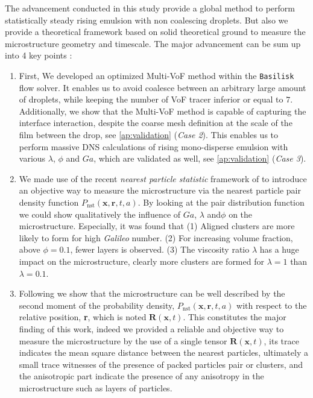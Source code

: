 The advancement conducted in this study provide a global method to perform statistically steady rising emulsion with non coalescing droplets.
But also we provide a theoretical framework based on solid theoretical ground to measure the microstructure geometry and timescale.
The major advancement can be sum up into 4 key points :
\begin{enumerate}
    \item First, We developed an optimized Multi-VoF method within the \texttt{Basilisk} flow solver. 
    It enables us to avoid coalesce between an arbitrary large amount of droplets, while keeping the number of VoF tracer inferior or equal to $7$. 
    Additionally, we show that the Multi-VoF method is capable of capturing the interface interaction, despite the coarse mesh definition at the scale of the film between the drop, see \ref{ap:validation} (\textit{Case 2}). 
    This enables us to perform massive DNS calculations of rising mono-disperse emulsion with various $\lambda$, $\phi$ and $Ga$, which are validated as well, see \ref{ap:validation} (\textit{Case 3}).  
    \item We made use of the recent \textit{nearest particle statistic} framework of \citet{zhang2023evolution} to introduce an objective way to measure the microstructure via the nearest particle pair density function $P_\text{nst}(\textbf{x},\textbf{r},t,a)$. 
    By looking at the pair distribution function we could show qualitatively the influence of $Ga$, $\lambda$ and$\phi$ on the microstructure.
    Especially, it was found that (1) Aligned clusters are more likely to form for high \textit{Galileo} number. (2) For increasing volume fraction, above $\phi = 0.1$, fewer layers is observed. (3) The viscosity ratio $\lambda$ has a huge impact on the microstructure, clearly more  clusters are formed for $\lambda = 1$ than $\lambda = 0.1$. 
    \item Following \citet{zhang2023evolution} we show that the microstructure can be well described by the second moment of the probability density, $P_\text{nst}(\textbf{x},\textbf{r},t,a)$ with respect to the relative position, \textbf{r}, which is noted $\textbf{R}(\textbf{x},t)$. 
    This constitutes the major finding of this work, indeed we provided a reliable and objective way to measure the microstructure by the use of a single tensor $\textbf{R}(\textbf{x},t)$, its trace indicates the mean square distance between the nearest particles, ultimately a small trace witnesses of the presence of packed particles pair or clusters, and the anisotropic part indicate the presence of  any anisotropy in the microstructure such as layers of particles. 

\end{enumerate}
